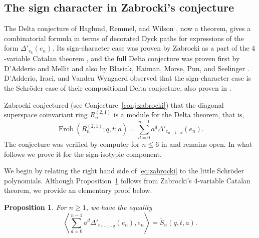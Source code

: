 \documentclass[11pt, noadjust, reqno]{amsart}
\newtheorem{proposition}[theorem]{Proposition}
\theoremstyle{definition}
\theoremstyle{remark}
\numberwithin{equation}{section}
\newcommand{\0}{\emptyset}
\DeclareMathOperator{\Frob}{Frob}
\begin{document}
\subsection{The sign character in Zabrocki's conjecture} \label{subsec:zabrocki-conj}
The Delta conjecture of Haglund, Remmel, and Wilson \cite{HaglundRemmelWilson2018}, now a theorem, gives a combinatorial formula in terms of decorated Dyck paths for expressions of the form $\Delta'_{e_k}(e_n)$. 
Its sign-character case was proven by Zabrocki as a part of the $4$-variable Catalan theorem \cite{Zabrocki-4Catalan-2016}, and the full Delta conjecture was proven first by D'Adderio and Mellit \cite{DAdderioMellit} and also by Blasiak, Haiman, Morse, Pun, and Seelinger \cite{BHMPS-Delta}. 
D'Adderio, Iraci, and Vanden Wyngaerd \cite[Section~6]{D_Adderio_2021} observed that the sign-character case is the Schr\"oder case of their compositional Delta conjecture, also proven in \cite{DAdderioMellit}.

Zabrocki \cite{Zabrocki2019} conjectured (see Conjecture~\ref{conj:zabrocki}) that the diagonal superspace coinvariant ring $R_n^{(2,1)}$ is a module for the Delta theorem, that is,
\begin{equation}\label{eq:zabrocki}
    \Frob(R_n^{(2,1)};q,t;a) = \sum_{d=0}^{n-1} a^d \Delta'_{e_{n-1-d}}(e_n).
\end{equation}
The conjecture was verified by computer for $n \leq 6$ in \cite{Zabrocki2019} and remains open. 
In what follows we prove it for the sign-isotypic component.

We begin by relating the right hand side of \eqref{eq:zabrocki} to the little Schr\"oder polynomials. Although Proposition~\ref{prop:zabrocki-alternating} follows from Zabrocki's 4-variable Catalan theorem, we provide an elementary proof below.

\begin{proposition}\label{prop:zabrocki-alternating}
For $n \geq 1$, we have the equality
    \begin{equation*}
        \left\langle \sum_{d=0}^{n-1} a^d\Delta'_{e_{n-1-d}}(e_n),e_n
        \right\rangle = \widetilde{S}_n(q,t,a).
    \end{equation*}
\end{proposition}
\end{document}
